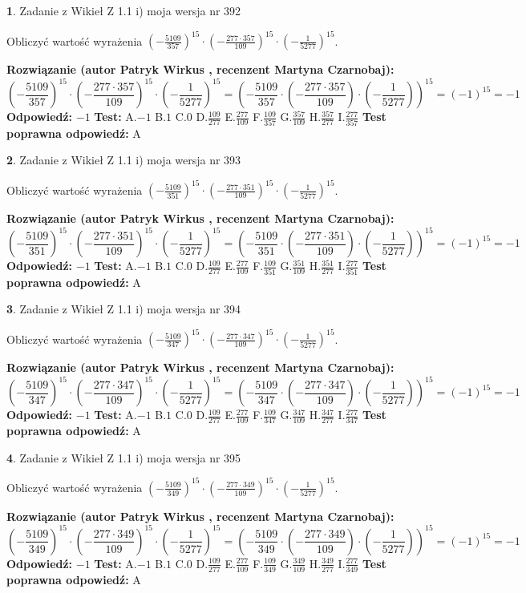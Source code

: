 \documentclass[12pt, a4paper]{article}
\theoremstyle{definition} %
\newtheorem{zad}{}
\newcommand{\zadStart}[1]{\begin{zad}#1\newline}
\newcommand{\zadStop}{\end{zad}}
\newcommand{\rozwStart}[2]{\noindent \textbf{Rozwiązanie (autor #1 , recenzent #2): }\newline}
\newcommand{\rozwStop}{\newline}
\newcommand{\odpStart}{\noindent \textbf{Odpowiedź:}\newline}
\newcommand{\odpStop}{\newline}
\newcommand{\testStart}{\noindent \textbf{Test:}\newline}
\newcommand{\testStop}{\newline}
\newcommand{\kluczStart}{\noindent \textbf{Test poprawna odpowiedź:}\newline}
\newcommand{\kluczStop}{\newline}
\begin{document}
\zadStart{Zadanie z Wikieł Z 1.1 i) moja wersja nr 392}

Obliczyć wartość wyrażenia $(-\frac{5109}{357})^{15} \cdot (-\frac{277 \cdot 357}{109})^{15} \cdot (-\frac{1}{5277})^{15}$.
\zadStop
\rozwStart{Patryk Wirkus}{Martyna Czarnobaj}
$$(-\frac{5109}{357})^{15} \cdot (-\frac{277 \cdot 357}{109})^{15} \cdot (-\frac{1}{5277})^{15} = (-\frac{5109}{357} \cdot (-\frac{277 \cdot 357}{109}) \cdot (-\frac{1}{5277}))^{15} = (-1)^{15} = -1$$
\rozwStop
\odpStart
$-1$
\odpStop
\testStart
A.$-1$ B.$1$ C.$0$ D.$\frac{109}{277}$ E.$\frac{277}{109}$
F.$\frac{109}{357}$ G.$\frac{357}{109}$
H.$\frac{357}{277}$
I.$\frac{277}{357}$
\testStop
\kluczStart
A
\kluczStop



\zadStart{Zadanie z Wikieł Z 1.1 i) moja wersja nr 393}

Obliczyć wartość wyrażenia $(-\frac{5109}{351})^{15} \cdot (-\frac{277 \cdot 351}{109})^{15} \cdot (-\frac{1}{5277})^{15}$.
\zadStop
\rozwStart{Patryk Wirkus}{Martyna Czarnobaj}
$$(-\frac{5109}{351})^{15} \cdot (-\frac{277 \cdot 351}{109})^{15} \cdot (-\frac{1}{5277})^{15} = (-\frac{5109}{351} \cdot (-\frac{277 \cdot 351}{109}) \cdot (-\frac{1}{5277}))^{15} = (-1)^{15} = -1$$
\rozwStop
\odpStart
$-1$
\odpStop
\testStart
A.$-1$ B.$1$ C.$0$ D.$\frac{109}{277}$ E.$\frac{277}{109}$
F.$\frac{109}{351}$ G.$\frac{351}{109}$
H.$\frac{351}{277}$
I.$\frac{277}{351}$
\testStop
\kluczStart
A
\kluczStop



\zadStart{Zadanie z Wikieł Z 1.1 i) moja wersja nr 394}

Obliczyć wartość wyrażenia $(-\frac{5109}{347})^{15} \cdot (-\frac{277 \cdot 347}{109})^{15} \cdot (-\frac{1}{5277})^{15}$.
\zadStop
\rozwStart{Patryk Wirkus}{Martyna Czarnobaj}
$$(-\frac{5109}{347})^{15} \cdot (-\frac{277 \cdot 347}{109})^{15} \cdot (-\frac{1}{5277})^{15} = (-\frac{5109}{347} \cdot (-\frac{277 \cdot 347}{109}) \cdot (-\frac{1}{5277}))^{15} = (-1)^{15} = -1$$
\rozwStop
\odpStart
$-1$
\odpStop
\testStart
A.$-1$ B.$1$ C.$0$ D.$\frac{109}{277}$ E.$\frac{277}{109}$
F.$\frac{109}{347}$ G.$\frac{347}{109}$
H.$\frac{347}{277}$
I.$\frac{277}{347}$
\testStop
\kluczStart
A
\kluczStop



\zadStart{Zadanie z Wikieł Z 1.1 i) moja wersja nr 395}

Obliczyć wartość wyrażenia $(-\frac{5109}{349})^{15} \cdot (-\frac{277 \cdot 349}{109})^{15} \cdot (-\frac{1}{5277})^{15}$.
\zadStop
\rozwStart{Patryk Wirkus}{Martyna Czarnobaj}
$$(-\frac{5109}{349})^{15} \cdot (-\frac{277 \cdot 349}{109})^{15} \cdot (-\frac{1}{5277})^{15} = (-\frac{5109}{349} \cdot (-\frac{277 \cdot 349}{109}) \cdot (-\frac{1}{5277}))^{15} = (-1)^{15} = -1$$
\rozwStop
\odpStart
$-1$
\odpStop
\testStart
A.$-1$ B.$1$ C.$0$ D.$\frac{109}{277}$ E.$\frac{277}{109}$
F.$\frac{109}{349}$ G.$\frac{349}{109}$
H.$\frac{349}{277}$
I.$\frac{277}{349}$
\testStop
\kluczStart
A
\kluczStop
\end{document}
